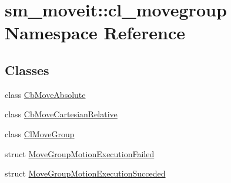 \hypertarget{namespacesm__moveit_1_1cl__movegroup}{}\section{sm\+\_\+moveit\+:\+:cl\+\_\+movegroup Namespace Reference}
\label{namespacesm__moveit_1_1cl__movegroup}
\subsection*{Classes}
\begin{DoxyCompactItemize}
\item 
class \hyperlink{classsm__moveit_1_1cl__movegroup_1_1CbMoveAbsolute}{Cb\+Move\+Absolute}
\item 
class \hyperlink{classsm__moveit_1_1cl__movegroup_1_1CbMoveCartesianRelative}{Cb\+Move\+Cartesian\+Relative}
\item 
class \hyperlink{classsm__moveit_1_1cl__movegroup_1_1ClMoveGroup}{Cl\+Move\+Group}
\item 
struct \hyperlink{structsm__moveit_1_1cl__movegroup_1_1MoveGroupMotionExecutionFailed}{Move\+Group\+Motion\+Execution\+Failed}
\item 
struct \hyperlink{structsm__moveit_1_1cl__movegroup_1_1MoveGroupMotionExecutionSucceded}{Move\+Group\+Motion\+Execution\+Succeded}
\end{DoxyCompactItemize}
